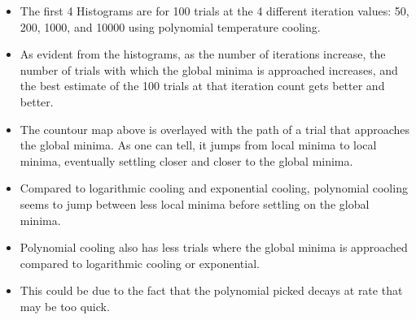 \documentclass[11pt]{article}
\makeatletter
\providecommand{\tightlist}{%
      \setlength{\itemsep}{0pt}\setlength{\parskip}{0pt}}
\newcommand{\boxspacing}{\kern\kvtcb@left@rule\kern\kvtcb@boxsep}
\newcommand{\prompt}[4]{
        \ttfamily\llap{{\color{#2}[#3]:\hspace{3pt}#4}}\vspace{-\baselineskip}
    }
\makeatother
\begin{document}
    \begin{itemize}
\tightlist
\item
  The first 4 Histograms are for 100 trials at the 4 different iteration
  values: 50, 200, 1000, and 10000 using polynomial temperature cooling.
\item
  As evident from the histograms, as the number of iterations increase,
  the number of trials with which the global minima is approached
  increases, and the best estimate of the 100 trials at that iteration
  count gets better and better.
\item
  The countour map above is overlayed with the path of a trial that
  approaches the global minima. As one can tell, it jumps from local
  minima to local minima, eventually settling closer and closer to the
  global minima.
\item
  Compared to logarithmic cooling and exponential cooling, polynomial
  cooling seems to jump between less local minima before settling on the
  global minima.
\item
  Polynomial cooling also has less trials where the global minima is
  approached compared to logarithmic cooling or exponential.
\item
  This could be due to the fact that the polynomial picked decays at
  rate that may be too quick.
\end{itemize}

    \begin{tcolorbox}[breakable, size=fbox, boxrule=1pt, pad at break*=1mm,colback=cellbackground, colframe=cellborder]
\prompt{In}{incolor}{ }{\boxspacing}
\begin{Verbatim}[commandchars=\\\{\}]

\end{Verbatim}
\end{tcolorbox}


    
    
    
\end{document}
